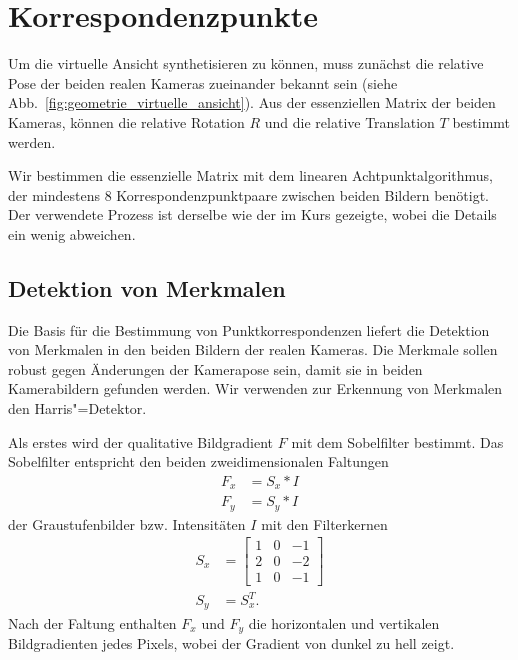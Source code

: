 \section{Korrespondenzpunkte}
\label{sec:korrespondenzpunkte}

Um die virtuelle Ansicht synthetisieren zu können, muss zunächst die relative Pose der beiden realen Kameras zueinander bekannt sein (siehe Abb.~\ref{fig:geometrie_virtuelle_ansicht}). Aus der essenziellen Matrix der beiden Kameras, können die relative Rotation $R$ und die relative Translation $T$ bestimmt werden.

Wir bestimmen die essenzielle Matrix mit dem linearen Achtpunktalgorithmus, der mindestens 8 Korrespondenzpunktpaare zwischen beiden Bildern benötigt. Der verwendete Prozess ist derselbe wie der im Kurs gezeigte, wobei die Details ein wenig abweichen.

\subsection{Detektion von Merkmalen}
Die Basis für die Bestimmung von Punktkorrespondenzen liefert die Detektion von Merkmalen in den beiden Bildern der realen Kameras. Die Merkmale sollen robust gegen Änderungen der Kamerapose sein, damit sie in beiden Kamerabildern gefunden werden. Wir verwenden zur Erkennung von Merkmalen den Harris"=Detektor.

Als erstes wird der qualitative Bildgradient $F$ mit dem Sobelfilter bestimmt. Das Sobelfilter entspricht den beiden zweidimensionalen Faltungen
\begin{align}
	F_x &= S_x * I\\
	F_y &= S_y * I
\end{align}
der Graustufenbilder bzw. Intensitäten $I$ mit den Filterkernen
\begin{align}
	S_x &=
	\begin{bmatrix}
	1 & 0 & -1\\
	2 & 0 & -2\\
	1 & 0 & -1	
	\end{bmatrix}\\
	S_y &= S_x^T.
\end{align}
Nach der Faltung enthalten $F_x$ und $F_y$ die horizontalen und vertikalen Bildgradienten jedes Pixels, wobei der Gradient von dunkel zu hell zeigt.

